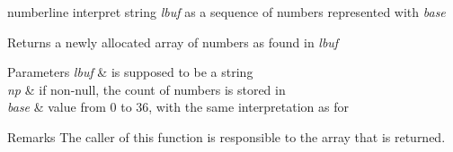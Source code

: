 \begin{DoxyDocu}{numberline}
\label{numberline_8c_ab5f1d634f58af036da64a49688535fe1_ab5f1d634f58af036da64a49688535fe1}
interpret string {\itshape lbuf} as a sequence of numbers represented with {\itshape base}

\begin{DoxyReturn}{Returns}
a newly allocated array of numbers as found in {\itshape lbuf}
\end{DoxyReturn}

\begin{DoxyParams}{Parameters}
{\em lbuf} & is supposed to be a string \\
\hline
{\em np} & if non-null, the count of numbers is stored in  \\
\hline
{\em base} & value from 0 to 36, with the same interpretation as for  \\
\hline
\end{DoxyParams}
\begin{DoxyRemark}{Remarks}
The caller of this function is responsible to  the array that is returned.
\end{DoxyRemark}


\end{DoxyDocu}
